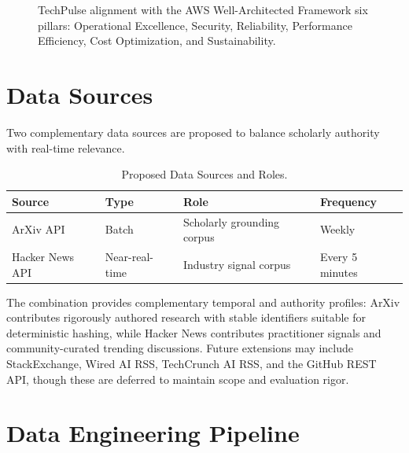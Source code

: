 \documentclass[12pt,a4paper]{report}
\begin{document}
\begin{figure}[H]
\caption{TechPulse alignment with the AWS Well-Architected Framework six pillars: Operational Excellence, Security, Reliability, Performance Efficiency, Cost Optimization, and Sustainability.}
\label{fig:well_arch}
\end{figure}

\section{Data Sources}
\label{sec:data_sources}

Two complementary data sources are proposed to balance scholarly authority with real-time relevance.

\begin{table}[H]
\caption{Proposed Data Sources and Roles.}
\label{tab:data_sources}
\centering
\begin{tabular}{p{3.0cm}p{2.5cm}p{4.5cm}p{2.5cm}}
\toprule
\textbf{Source} & \textbf{Type} & \textbf{Role} & \textbf{Frequency} \\
\midrule
ArXiv API & Batch & Scholarly grounding corpus & Weekly \\
Hacker News API & Near-real-time & Industry signal corpus & Every 5 minutes \\
\bottomrule
\end{tabular}
\end{table}

The combination provides complementary temporal and authority profiles: ArXiv contributes rigorously authored research with stable identifiers suitable for deterministic hashing, while Hacker News contributes practitioner signals and community-curated trending discussions. Future extensions may include StackExchange, Wired AI RSS, TechCrunch AI RSS, and the GitHub REST API, though these are deferred to maintain scope and evaluation rigor.

\section{Data Engineering Pipeline}
\label{sec:pipeline}
\end{document}
